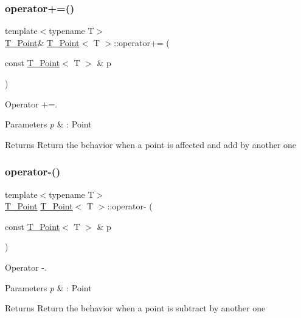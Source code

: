 \subsubsection{\texorpdfstring{operator+=()}{operator+=()}}
{\footnotesize\ttfamily template$<$typename T$>$ \\
\hyperlink{classT__Point}{T\+\_\+\+Point}\& \hyperlink{classT__Point}{T\+\_\+\+Point}$<$ T $>$\+::operator+= (\begin{DoxyParamCaption}\item[{const \hyperlink{classT__Point}{T\+\_\+\+Point}$<$ T $>$ \&}]{p }\end{DoxyParamCaption})\hspace{0.3cm}{\ttfamily [inline]}}



Operator +=. 


\begin{DoxyParams}{Parameters}
{\em p} & \+: Point \\
\hline
\end{DoxyParams}
\begin{DoxyReturn}{Returns}
Return the behavior when a point is affected and add by another one 
\end{DoxyReturn}
\mbox{\label{classT__Point_a4a3671d0a9763b3e749c799294ebb1ca}} 
\subsubsection{\texorpdfstring{operator-\/()}{operator-()}}
{\footnotesize\ttfamily template$<$typename T$>$ \\
\hyperlink{classT__Point}{T\+\_\+\+Point} \hyperlink{classT__Point}{T\+\_\+\+Point}$<$ T $>$\+::operator-\/ (\begin{DoxyParamCaption}\item[{const \hyperlink{classT__Point}{T\+\_\+\+Point}$<$ T $>$ \&}]{p }\end{DoxyParamCaption})\hspace{0.3cm}{\ttfamily [inline]}}



Operator -\/. 


\begin{DoxyParams}{Parameters}
{\em p} & \+: Point \\
\hline
\end{DoxyParams}
\begin{DoxyReturn}{Returns}
Return the behavior when a point is subtract by another one 
\end{DoxyReturn}
\mbox{\label{classT__Point_aa438de3090999e1f24f0de58dc5171a0}} 
